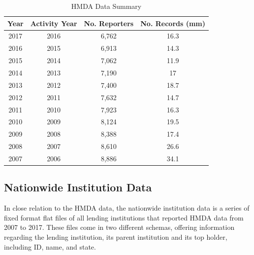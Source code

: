 \documentclass[conference,compsoc]{IEEEtran}
\begin{document}
\begin{table}[h!]
\centering
\begin{tabular}{|c|c|c|c|}
\hline
\textbf{Year} & \textbf{Activity Year} & \textbf{No. Reporters} & \textbf{No. Records  (mm)} \\ \hline
2017           & 2016               & 6,762                      & 16.3                                    \\ \hline
2016           & 2015               & 6,913                      & 14.3                                    \\ \hline
2015           & 2014               & 7,062                      & 11.9                                    \\ \hline
2014           & 2013               & 7,190                      & 17                                      \\ \hline
2013           & 2012               & 7,400                      & 18.7                                    \\ \hline
2012           & 2011               & 7,632                      & 14.7                                    \\ \hline
2011           & 2010               & 7,923                      & 16.3                                    \\ \hline
2010           & 2009               & 8,124                      & 19.5                                    \\ \hline
2009           & 2008               & 8,388                      & 17.4                                    \\ \hline
2008           & 2007               & 8,610                      & 26.6                                    \\ \hline
2007           & 2006               & 8,886                      & 34.1                                   \\ \hline
\end{tabular}
\caption{HMDA Data Summary}
\end{table}

\subsection{Nationwide Institution Data}
In close relation to the HMDA data, the nationwide institution data is a series of fixed format flat files of all lending institutions that reported HMDA data from 2007 to 2017. These files come in two different schemas, offering information regarding the lending institution, its parent institution and its top holder, including ID, name, and state. 
\end{document}

